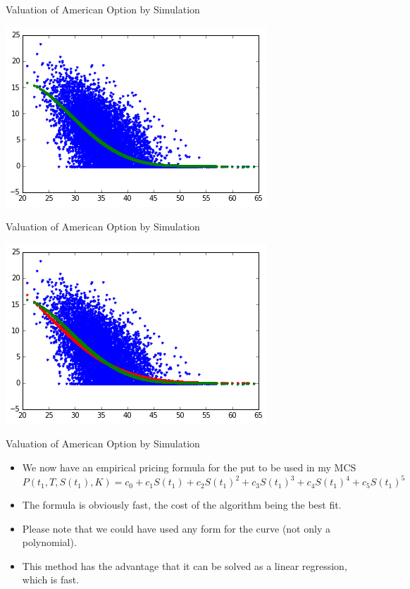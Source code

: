 \documentclass[11pt]{beamer}
\begin{document}
\begin{frame}{Valuation of American Option by Simulation}
\begin{center}
\includegraphics[scale=.8]{img/lsm_3.png} 
\end{center}
\end{frame}
\begin{frame}{Valuation of American Option by Simulation}
\begin{center}
\includegraphics[scale=.8]{img/lsm_4.png} 
\end{center}
\end{frame}
\begin{frame}{Valuation of American Option by Simulation}
\begin{itemize}
\item We now have an empirical pricing formula for the put to be used in my MCS
\footnotesize
$$P(t_1, T, S(t_1), K) = c_0 + c_1S(t_1) + c_2S(t_1)^2 + c_3S(t_1)^3 + c_4S(t_1)^4 + c_5S(t_1)^5$$
\normalsize
\item The formula is obviously fast, the cost of the algorithm being the best fit. 
\item Please note that we could have used any form for the curve (not only a polynomial). 
\item This method has the advantage that it can be solved as a linear regression, which is fast.
\end{itemize}
\end{frame}
\end{document}
